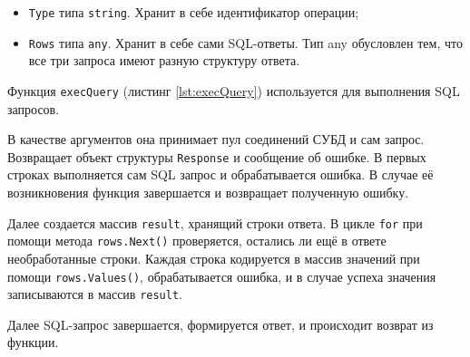 \begin{itemize}
    \item \texttt{Type} типа \texttt{string}.
    Хранит в себе идентификатор операции;
    \item \texttt{Rows} типа \texttt{any}.
    Хранит в себе сами SQL-ответы.
    Тип any обусловлен тем, что все три запроса имеют разную структуру ответа.
\end{itemize}

\begin{listing}[H]
    \caption{Структура, используемая для HTTP-ответа}
    \label{lst:response}
\end{listing}

Функция \texttt{execQuery} (листинг \ref{lst:execQuery}) используется для выполнения SQL запросов.

\begin{listing}[H]
    \caption{Вспомогательная функция execQuery}
    \label{lst:execQuery}
\end{listing}

В качестве аргументов она принимает пул соединений СУБД и сам запрос.
Возвращает объект структуры \texttt{Response} и сообщение об ошибке.
В первых строках выполняется сам SQL запрос и обрабатывается ошибка.
В случае её возникновения функция завершается и возвращает полученную ошибку.

Далее создается массив \texttt{result}, хранящий строки ответа.
В цикле \texttt{for} при помощи метода \texttt{rows.Next()} проверяется, остались ли ещё в ответе необработанные строки.
Каждая строка кодируется в массив значений при помощи \texttt{rows.Values()}, обрабатывается ошибка, и в случае успеха
значения записываются в массив \texttt{result}.

Далее SQL-запрос завершается, формируется ответ, и происходит возврат из функции.